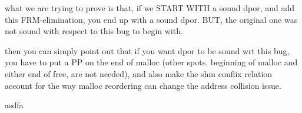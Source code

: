 %
%

what we are trying to prove is that, if we START WITH a sound dpor, and add this FRM-elimination, you end up with a sound dpor. BUT, the original one was not sound with respect to this bug to begin with.

then you can simply point out that if you want dpor to be sound wrt this bug, you have to put a PP on the end of malloc (other spots, beginning of malloc and either end of free, are not needed), and also make the shm conflix relation account for the way malloc reordering can change the address collision issue.


\begin{lemma}
	asdfa
	\label{lem:leia} %
\end{lemma}

%
%
%
%
%
%
%
%
%
